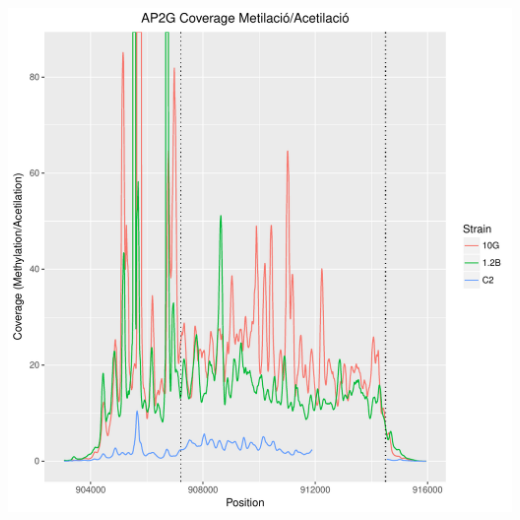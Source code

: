 \documentclass{article}\usepackage[]{graphicx}\usepackage[]{color}
\newenvironment{knitrout}{}{} %
\begin{document}
\clearpage
\begin{knitrout}
\color{fgcolor}
\includegraphics[width=1\linewidth]{figure/Met_Ac-1} 

\end{knitrout}
\end{document}
